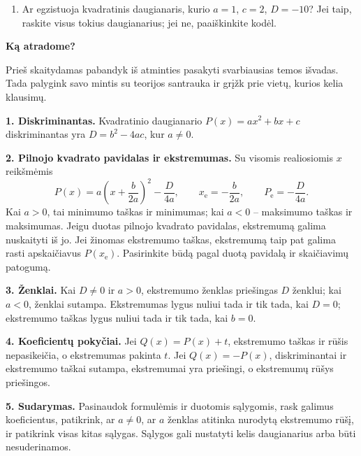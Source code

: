 \documentclass[12pt,a4paper]{article}
\newcommand{\svarbu}{\tikz[baseline=(zenklas.base)]\node[circle,draw=blue!50!black,line width=0.6pt,minimum size=4.5mm,inner sep=0pt,font=\sffamily\bfseries\small,text=blue!50!black] (zenklas) {!};}
\begin{document}
\begin{enumerate}
\begin{enumerate}
\item $a=1$, $b=-4$, $D=4$;
\item $a=2$, $c=2$, $D=0$;
\item $a=1$, $D=16$, $x_{\min}=2$;
\item $b=-6$, $x_{\min}=1$, $D=12$;
\item $a=-2$, $P(0)=1$, $D=24$;
\item $D=24$, $P_{\min}=-2$, $x_{\min}=2$;
\item $D=-24$, $P_{\min}=2$, $x_{\min}=-1$. Palyginkite gautą daugianarį su 16a punkto atsakymu. Kodėl, nors sąlygos skirtingos, gaunamas tas pats daugianaris?
\item $D=16$, $P_{\max}=4$, $P(0)=3$;
\item $D=8$, $P_{\min}=2$, $x_{\min}=1$.
\end{enumerate}
\item Ar egzistuoja kvadratinis daugianaris, kurio $a=1$, $c=2$, $D=-10$? Jei taip, raskite visus tokius daugianarius; jei ne, paaiškinkite kodėl.
\end{enumerate}
\newpage
\begin{center}{\Large\bfseries Ką atradome?}\end{center}
Prieš skaitydamas pabandyk iš atminties pasakyti svarbiausias temos išvadas. Tada palygink savo mintis su teorijos santrauka ir grįžk prie vietų, kurios kelia klausimų.
\begin{tcolorbox}[colback=blue!3,colframe=blue!40!black,boxrule=0.5pt,arc=1mm,colbacktitle=blue!8,coltitle=black,title={\svarbu\quad\bfseries Svarbiausios temos išvados}]
\textbf{1. Diskriminantas.} Kvadratinio daugianario $P(x)=ax^2+bx+c$ diskriminantas yra $D=b^2-4ac$, kur $a\ne0$.

\textbf{2. Pilnojo kvadrato pavidalas ir ekstremumas.} Su visomis realiosiomis $x$ reikšmėmis
\[
P(x)=a\left(x+\frac{b}{2a}\right)^2-\frac{D}{4a},\qquad
x_{\mathrm e}=-\frac{b}{2a},\qquad P_{\mathrm e}=-\frac{D}{4a}.
\]
Kai $a>0$, tai minimumo taškas ir minimumas; kai $a<0$ – maksimumo taškas ir maksimumas. Jeigu duotas pilnojo kvadrato pavidalas, ekstremumą galima nuskaityti iš jo. Jei žinomas ekstremumo taškas, ekstremumą taip pat galima rasti apskaičiavus $P(x_{\mathrm e})$. Pasirinkite būdą pagal duotą pavidalą ir skaičiavimų patogumą.

\textbf{3. Ženklai.} Kai $D\ne0$ ir $a>0$, ekstremumo ženklas priešingas $D$ ženklui; kai $a<0$, ženklai sutampa. Ekstremumas lygus nuliui tada ir tik tada, kai $D=0$; ekstremumo taškas lygus nuliui tada ir tik tada, kai $b=0$.

\textbf{4. Koeficientų pokyčiai.} Jei $Q(x)=P(x)+t$, ekstremumo taškas ir rūšis nepasikeičia, o ekstremumas pakinta $t$. Jei $Q(x)=-P(x)$, diskriminantai ir ekstremumo taškai sutampa, ekstremumai yra priešingi, o ekstremumų rūšys priešingos.

\textbf{5. Sudarymas.} Pasinaudok formulėmis ir duotomis sąlygomis, rask galimus koeficientus, patikrink, ar $a\ne0$, ar $a$ ženklas atitinka nurodytą ekstremumo rūšį, ir patikrink visas kitas sąlygas. Sąlygos gali nustatyti kelis daugianarius arba būti nesuderinamos.
\end{tcolorbox}
\end{document}
